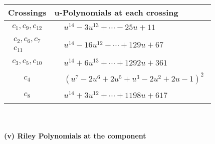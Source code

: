 \documentclass[1p]{elsarticle_modified}
\theoremstyle{definition}
\begin{document}
\begin{tabular}{m{50pt}|m{274pt}}
Crossings & \hspace{64pt}u-Polynomials at each crossing \\
\hline $$\begin{aligned}c_{1},c_{9},c_{12}\end{aligned}$$&$\begin{aligned}
&u^{14}-3 u^{13}+\cdots-25 u+11
\end{aligned}$\\
\hline $$\begin{aligned}c_{2},c_{6},c_{7}\\c_{11}\end{aligned}$$&$\begin{aligned}
&u^{14}-16 u^{12}+\cdots+129 u+67
\end{aligned}$\\
\hline $$\begin{aligned}c_{3},c_{5},c_{10}\end{aligned}$$&$\begin{aligned}
&u^{14}+6 u^{13}+\cdots+1292 u+361
\end{aligned}$\\
\hline $$\begin{aligned}c_{4}\end{aligned}$$&$\begin{aligned}
&(u^7-2 u^6+2 u^5+u^3-2 u^2+2 u-1)^2
\end{aligned}$\\
\hline $$\begin{aligned}c_{8}\end{aligned}$$&$\begin{aligned}
&u^{14}+3 u^{12}+\cdots+1198 u+617
\end{aligned}$\\
\hline
\end{tabular}\\~\\
\newpage\renewcommand{\arraystretch}{1}
\flushleft \textbf{(v) Riley Polynomials at the component}\newline \\
\end{document}
